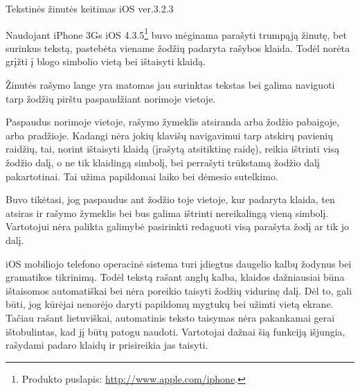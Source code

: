 \begin{xcase}{Tekstinės žinutės keitimas iOS ver.3.2.3}
  \xcgoal
  {
  	Naudojant iPhone 3Gs 
	iOS 4.3.5\footnote{Produkto puslapis: \url{http://www.apple.com/iphone}.}
	buvo mėginama parašyti trumpąją žinutę, bet surinkus tekstą, pastebėta 
	viename žodžių padaryta rašybos klaida. Todėl norėta grįžti į blogo 
	simbolio vietą bei ištaisyti klaidą.
	
  }
  
  \xctools
  {
    Žinutės rašymo lange yra matomas jau surinktas tekstas bei galima 
    naviguoti tarp žodžių pirštu paspaudžiant norimoje vietoje. 
  }
  
  \xcresult
  {
    Paspaudus norimoje vietoje, rašymo žymeklis atsiranda arba žodžio
    pabaigoje, arba pradžioje. Kadangi nėra jokių klavišų navigavimui tarp
    atskirų pavienių raidžių, tai, norint ištaisyti klaidą 
    (įrašytą atsitiktinę raidę), reikia ištrinti visą žodžio dalį, o ne tik 
    klaidingą simbolį, bei perrašyti trūkstamą žodžio dalį pakartotinai. Tai 
    užima papildomai laiko bei dėmesio sutelkimo.
  }
  
  \xcprinciples
  {
    {
      Buvo tikėtasi, jog paspaudus ant žodžio toje vietoje, kur padaryta klaida,
      ten atsiras ir rašymo žymeklis bei bus galima ištrinti nereikalingą vieną
      simbolį.
    }
    {
      Vartotojui nėra palikta galimybė pasirinkti redaguoti visą parašyta žodį
      ar tik jo dalį.
    }
  }
  
  \xcthoughts
  {
    iOS mobiliojo telefono operacinė sistema turi įdiegtus daugelio kalbų
    žodynus bei gramatikos tikrinimą. Todėl tekstą rašant anglų kalba, 
    klaidos dažniausiai būna ištaisomos automatiškai bei nėra poreikio taisyti 
    žodžių vidurinę dalį. Dėl to, gali būti, jog kūrėjai nenorėjo daryti 
    papildomų mygtukų bei užimti vietą ekrane. 
    Tačiau rašant lietuviškai, automatinis teksto taisymas nėra pakankamai 
    gerai ištobulintas, kad jį būtų patogu naudoti. Vartotojai dažnai šią
    funkciją išjungia, rašydami padaro klaidų ir prisireikia jas taisyti.
  }
\end{xcase}
